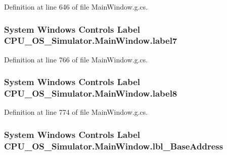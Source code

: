 Definition at line 646 of file Main\+Window.\+g.\+cs.

\hypertarget{class_c_p_u___o_s___simulator_1_1_main_window_a38ed6363fd03954967bda7a099f6b07e}{}
\subsubsection[{label7}]{\setlength{\rightskip}{0pt plus 5cm}System Windows Controls Label C\+P\+U\+\_\+\+O\+S\+\_\+\+Simulator.\+Main\+Window.\+label7\hspace{0.3cm}{\ttfamily [package]}}\label{class_c_p_u___o_s___simulator_1_1_main_window_a38ed6363fd03954967bda7a099f6b07e}


Definition at line 766 of file Main\+Window.\+g.\+cs.

\hypertarget{class_c_p_u___o_s___simulator_1_1_main_window_a216fc6a1692d8a8f8b80b08348c1dcd4}{}
\subsubsection[{label8}]{\setlength{\rightskip}{0pt plus 5cm}System Windows Controls Label C\+P\+U\+\_\+\+O\+S\+\_\+\+Simulator.\+Main\+Window.\+label8\hspace{0.3cm}{\ttfamily [package]}}\label{class_c_p_u___o_s___simulator_1_1_main_window_a216fc6a1692d8a8f8b80b08348c1dcd4}


Definition at line 774 of file Main\+Window.\+g.\+cs.

\hypertarget{class_c_p_u___o_s___simulator_1_1_main_window_ae3adff2ef98d792ce094dcc229c293a8}{}
\subsubsection[{lbl\+\_\+\+Base\+Address}]{\setlength{\rightskip}{0pt plus 5cm}System Windows Controls Label C\+P\+U\+\_\+\+O\+S\+\_\+\+Simulator.\+Main\+Window.\+lbl\+\_\+\+Base\+Address\hspace{0.3cm}{\ttfamily [package]}}\label{class_c_p_u___o_s___simulator_1_1_main_window_ae3adff2ef98d792ce094dcc229c293a8}


